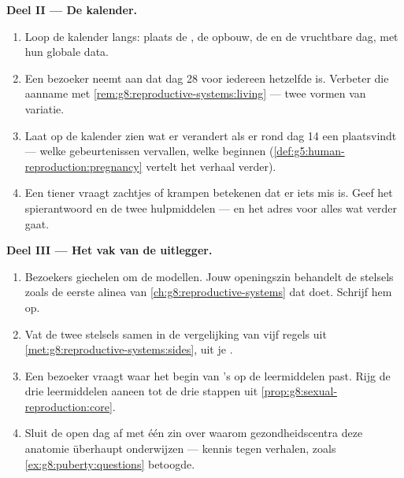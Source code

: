 \begin{problem}
\medskip\noindent\textbf{Deel II --- De kalender.}
\begin{enumerate}[resume]
  \item Loop de kalender langs: plaats de , de opbouw, de
         en de vruchtbare dag, met hun globale data.
  \item Een bezoeker neemt aan dat dag 28 voor iedereen hetzelfde is.
        Verbeter die aanname met
        \cref{rem:g8:reproductive-systems:living} --- twee vormen van
        variatie.
  \item Laat op de kalender zien wat er verandert als er rond dag 14 een
         plaatsvindt --- welke gebeurtenissen vervallen, welke
        beginnen
        (\cref{def:g5:human-reproduction:pregnancy} vertelt het verhaal
        verder).
  \item Een tiener vraagt zachtjes of krampen betekenen dat er iets mis
        is. Geef het spierantwoord en de twee hulpmiddelen --- en het
        adres voor alles wat verder gaat.
\end{enumerate}

\medskip\noindent\textbf{Deel III --- Het vak van de
uitlegger.}
\begin{enumerate}[resume]
  \item Bezoekers giechelen om de modellen. Jouw openingszin behandelt de
        stelsels zoals de eerste alinea van
        \cref{ch:g8:reproductive-systems} dat doet. Schrijf hem op.
  \item Vat de twee stelsels samen in de vergelijking van vijf regels uit
        \cref{met:g8:reproductive-systems:sides}, uit je .
  \item Een bezoeker vraagt waar het begin van 's op de leermiddelen
        past. Rijg de drie leermiddelen aaneen tot de drie stappen uit
        \cref{prop:g8:sexual-reproduction:core}.
  \item Sluit de open dag af met één zin over waarom
        gezondheidscentra deze anatomie überhaupt onderwijzen --- kennis
        tegen verhalen, zoals \cref{ex:g8:puberty:questions} betoogde.
\end{enumerate}
\end{problem}
